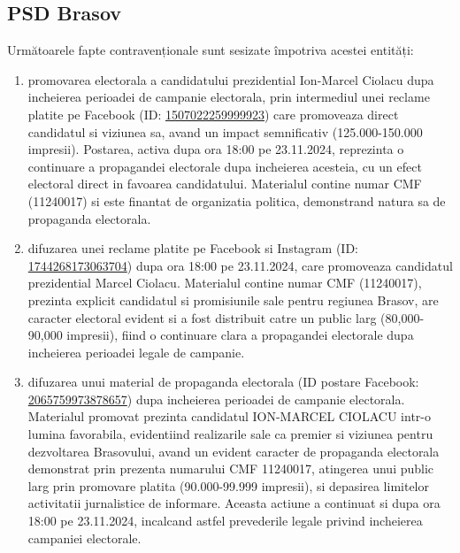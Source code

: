 \documentclass[a4paper,12pt]{article}
\begin{document}
\vspace{0.5cm}

\subsection{PSD Brasov}
Următoarele fapte contravenționale sunt sesizate împotriva acestei entități:

\begin{enumerate}[leftmargin=*, label=\arabic*.)]
    \item promovarea electorala a candidatului prezidential Ion-Marcel Ciolacu dupa incheierea perioadei de campanie electorala, prin intermediul unei reclame platite pe Facebook (ID: \href{https://www.facebook.com/ads/library/?id=1507022259999923}{1507022259999923}) care promoveaza direct candidatul si viziunea sa, avand un impact semnificativ (125.000-150.000 impresii). Postarea, activa dupa ora 18:00 pe 23.11.2024, reprezinta o continuare a propagandei electorale dupa incheierea acesteia, cu un efect electoral direct in favoarea candidatului. Materialul contine numar CMF (11240017) si este finantat de organizatia politica, demonstrand natura sa de propaganda electorala.
    \item difuzarea unei reclame platite pe Facebook si Instagram (ID: \href{https://www.facebook.com/ads/library/?id=1744268173063704}{1744268173063704}) dupa ora 18:00 pe 23.11.2024, care promoveaza candidatul prezidential Marcel Ciolacu. Materialul contine numar CMF (11240017), prezinta explicit candidatul si promisiunile sale pentru regiunea Brasov, are caracter electoral evident si a fost distribuit catre un public larg (80,000-90,000 impresii), fiind o continuare clara a propagandei electorale dupa incheierea perioadei legale de campanie.
    \item difuzarea unui material de propaganda electorala (ID postare Facebook: \href{https://www.facebook.com/ads/library/?id=2065759973878657}{2065759973878657}) dupa incheierea perioadei de campanie electorala. Materialul promovat prezinta candidatul ION-MARCEL CIOLACU intr-o lumina favorabila, evidentiind realizarile sale ca premier si viziunea pentru dezvoltarea Brasovului, avand un evident caracter de propaganda electorala demonstrat prin prezenta numarului CMF 11240017, atingerea unui public larg prin promovare platita (90.000-99.999 impresii), si depasirea limitelor activitatii jurnalistice de informare. Aceasta actiune a continuat si dupa ora 18:00 pe 23.11.2024, incalcand astfel prevederile legale privind incheierea campaniei electorale.

\end{enumerate}
\end{document}
